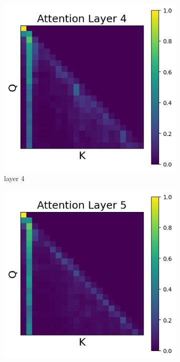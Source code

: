 \documentclass[11pt]{article}
\begin{document}
\begin{figure}[t]
  \begin{subfigure}[t]{0.24\textwidth}
    \centering
    \includegraphics[width=1.4\columnwidth]{figures/intervention3/layer_4.png}
    \caption{layer 4}
    \label{fig:obs2_layer4}
  \end{subfigure}\hfill
  \begin{subfigure}[t]{0.24\textwidth}
    \centering
    \includegraphics[width=1.4\columnwidth]{figures/intervention3/layer_5.png}

\end{subfigure}
\end{figure}
\end{document}

